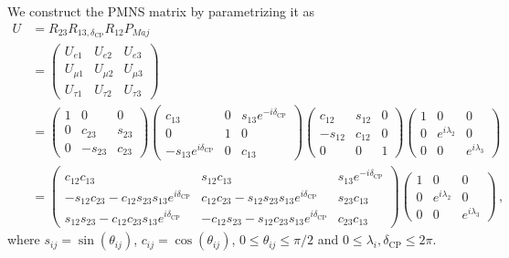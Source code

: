 We construct the PMNS matrix by parametrizing it as
\begin{align}\label{PMNS_def}
    U &= R_{23}R_{13,\delta_{\text{CP}}}R_{12}P_{Maj} \nonumber \\
     &= \begin{pmatrix}
        U_{e 1} & U_{e2} & U_{e3} \\
         U_{\mu 1} & U_{\mu 2} & U_{\mu 3} \\
         U_{\tau 1} & U_{\tau 2} & U_{\tau 3}
      \end{pmatrix} \nonumber \\
      & = \begin{pmatrix}1 & 0 & 0 \\ 0 & c_{23} & s_{23} \\ 0 & -s_{23} & c_{23}\end{pmatrix}
\begin{pmatrix}c_{13} & 0 & s_{13} e^{-i \delta_{\mathrm{CP}}} \\ 0 & 1 & 0 \\ -s_{13} e^{i \delta_{\mathrm{CP}}} & 0 & c_{13}\end{pmatrix}
\begin{pmatrix}c_{12} & s_{12} & 0 \\ -s_{12} & c_{12} & 0 \\ 0 & 0 & 1\end{pmatrix}
\begin{pmatrix}1 & 0 & 0 \\ 0 & e^{i \lambda_{2}} & 0 \\ 0 & 0 & e^{i \lambda_{3}}\end{pmatrix}
\nonumber \\
 &=\begin{pmatrix}c_{12} c_{13} & s_{12} c_{13} & s_{13} e^{-i \delta_{\mathrm{CP}}} \\ 
        -s_{12} c_{23}-c_{12} s_{23} s_{13}e^{i \delta_{\mathrm{CP}}} & c_{12} c_{23}-s_{12} s_{23} s_{13}e^{i \delta_{\mathrm{CP}}} & s_{23} c_{13} \\ 
        s_{12} s_{23}-c_{12} c_{23} s_{13}e^{i \delta_{\mathrm{CP}}}  & -c_{12} s_{23}-s_{12} c_{23} s_{13}e^{i \delta_{\mathrm{CP}}} & c_{23} c_{13}
    \end{pmatrix}
    \begin{pmatrix}1 & 0 & 0 \\ 0 & e^{i \lambda_{2}} & 0 \\ 0 & 0 & e^{i \lambda_{3}}\end{pmatrix}\,,
\end{align}
where $s_{ij} = \sin(\theta_{ij})$, $c_{ij} = \cos(\theta_{ij})$, $0 \leq \theta_{ij} \leq \pi/2$ and $ 0 \leq \lambda_{i},\delta_\mathrm{CP} \leq 2\pi$. 

